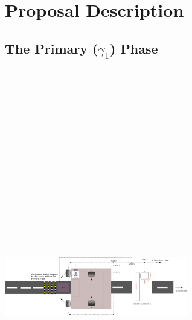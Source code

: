 \documentclass[a4paper,11pt]{article}
\begin{document}
\section{Proposal Description}
\subsection{The Primary ($\gamma_1$) Phase}
 \includegraphics[width=8cm,height = 19cm ]{Primary Phase.png}
\end{document}
